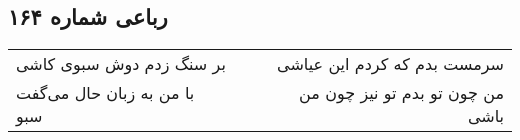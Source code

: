 \begin{center}
\section*{رباعی شماره ۱۶۴}
\label{sec:sh164}
\begin{longtable}{l p{0.5cm} r}
بر سنگ زدم دوش سبوی کاشی
&&
سرمست بدم که کردم این عیاشی
\\
با من به زبان حال می‌گفت سبو
&&
من چون تو بدم تو نیز چون من باشی
\\
\end{longtable}
\end{center}
